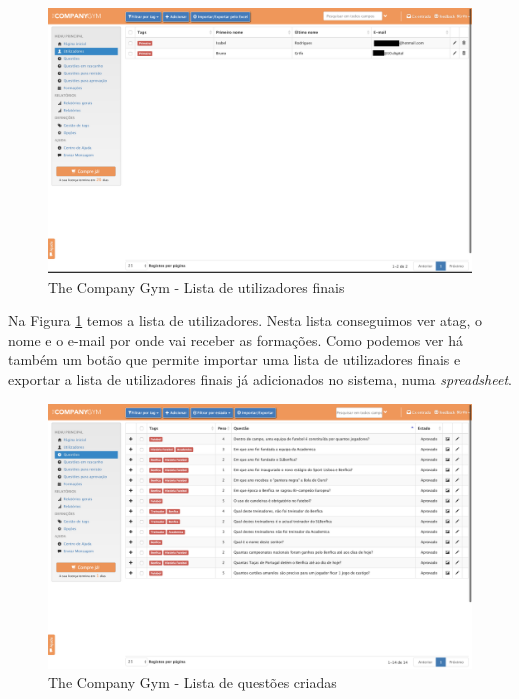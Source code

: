 \begin{figure}[ht!]
	\begin{center}
		\includegraphics[width=1\textwidth]{img/tcg/tcg-utilizadores.png}
		\caption{The Company Gym - Lista de utilizadores finais}
		\label{fig:tcg-utilizadores}
	\end{center}
\end{figure}

Na Figura \ref{fig:tcg-utilizadores} temos a lista de utilizadores. Nesta lista conseguimos ver atag, o nome e o e-mail por onde vai receber as formações. Como podemos ver há também um botão que permite importar uma lista de utilizadores finais e exportar a lista de utilizadores finais já adicionados no sistema, numa \textit{spreadsheet}.
\newpage

\begin{figure}[ht!]
	\begin{center}
		\includegraphics[width=1\textwidth]{img/tcg/tcg-questoes.png}
		\caption{The Company Gym - Lista de questões criadas}
		\label{fig:tcg-questoes}
	\end{center}
\end{figure}

